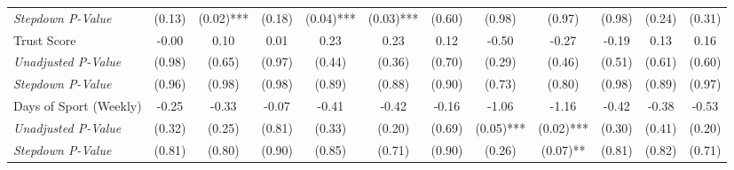 \begin{tabular}{l c c c c c c c c c c c}
\quad \textit{Stepdown P-Value} & (0.13) & (0.02)*** & (0.18) & (0.04)*** & (0.03)*** & (0.60) & (0.98) & (0.97) & (0.98) & (0.24) & (0.31) \\
Trust Score & -0.00 & 0.10 & 0.01 & 0.23 & 0.23 & 0.12 & -0.50 & -0.27 & -0.19 & 0.13 & 0.16 \\
\quad \textit{Unadjusted P-Value} & (0.98) & (0.65) & (0.97) & (0.44) & (0.36) & (0.70) & (0.29) & (0.46) & (0.51) & (0.61) & (0.60) \\
\quad \textit{Stepdown P-Value} & (0.96) & (0.98) & (0.98) & (0.89) & (0.88) & (0.90) & (0.73) & (0.80) & (0.98) & (0.89) & (0.97) \\
Days of Sport (Weekly) & -0.25 & -0.33 & -0.07 & -0.41 & -0.42 & -0.16 & -1.06 & -1.16 & -0.42 & -0.38 & -0.53 \\
\quad \textit{Unadjusted P-Value} & (0.32) & (0.25) & (0.81) & (0.33) & (0.20) & (0.69) & (0.05)*** & (0.02)*** & (0.30) & (0.41) & (0.20) \\
\quad \textit{Stepdown P-Value} & (0.81) & (0.80) & (0.90) & (0.85) & (0.71) & (0.90) & (0.26) & (0.07)** & (0.81) & (0.82) & (0.71) \\
\bottomrule
\end{tabular}
